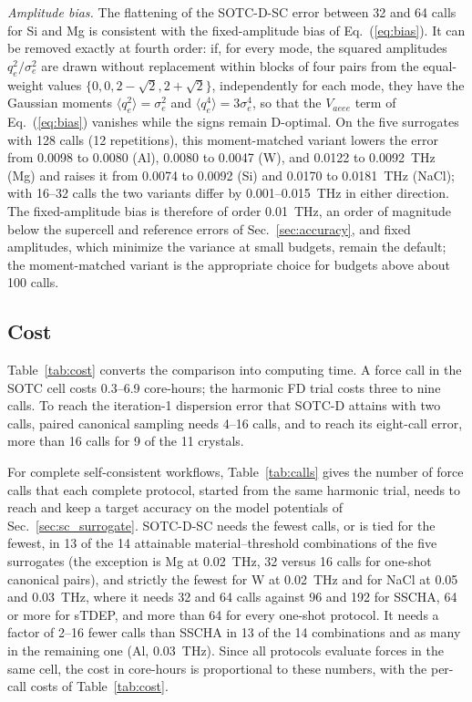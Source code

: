 \documentclass[aip,jap,reprint,amsmath,amssymb,floatfix]{revtex4-2}
\begin{document}
\textit{Amplitude bias.} The flattening of the SOTC-D-SC error between 32
and 64 calls for Si and Mg is consistent with the fixed-amplitude bias of
Eq.~(\ref{eq:bias}). It can be removed exactly at fourth order: if, for
every mode, the squared amplitudes $q_e^2/\sigma_e^2$ are drawn without
replacement within blocks of four pairs from the equal-weight values
$\{0,0,2-\sqrt2,2+\sqrt2\}$, independently for each mode, they have the
Gaussian moments $\langle q_e^2\rangle=\sigma_e^2$ and $\langle
q_e^4\rangle=3\sigma_e^4$, so that the $V_{aeee}$ term of Eq.~(\ref{eq:bias})
vanishes while the signs remain D-optimal. On the five surrogates with 128
calls (12 repetitions), this moment-matched variant lowers the error from
0.0098 to 0.0080 (Al), 0.0080 to 0.0047 (W), and 0.0122 to 0.0092~THz
(Mg) and raises it from 0.0074 to 0.0092 (Si) and 0.0170 to 0.0181~THz
(NaCl); with 16--32 calls the two variants differ by 0.001--0.015~THz in
either direction. The fixed-amplitude bias is therefore of order
0.01~THz, an order of magnitude below the supercell and reference errors of
Sec.~\ref{sec:accuracy}, and fixed amplitudes, which minimize the variance
at small budgets, remain the default; the moment-matched variant is the
appropriate choice for budgets above about 100 calls.



\subsection{Cost}

Table~\ref{tab:cost} converts the comparison into computing time. A force
call in the SOTC cell costs 0.3--6.9 core-hours; the harmonic FD trial costs
three to nine calls. To reach the iteration-1 dispersion error that SOTC-D
attains with two calls, paired canonical sampling needs 4--16 calls, and to
reach its eight-call error, more than 16 calls for 9 of the 11 crystals.

For complete self-consistent workflows, Table~\ref{tab:calls} gives the
number of force calls that each complete protocol, started from the same
harmonic trial, needs to reach and keep a target accuracy on the model
potentials of Sec.~\ref{sec:sc_surrogate}. SOTC-D-SC needs the fewest calls, or is tied
for the fewest, in 13 of the 14 attainable material--threshold combinations
of the five surrogates (the exception is Mg at 0.02~THz, 32 versus 16 calls
for one-shot canonical pairs), and strictly the fewest for W at 0.02~THz and
for NaCl at 0.05 and 0.03~THz, where it needs 32 and 64 calls against 96 and
192 for SSCHA, 64 or more for sTDEP, and more than 64 for every one-shot protocol. It
needs a factor of 2--16 fewer calls than SSCHA in 13 of the 14 combinations and as
many in the remaining one (Al, 0.03~THz). Since all protocols evaluate forces
in the same cell, the cost in core-hours is proportional to these numbers,
with the per-call costs of Table~\ref{tab:cost}.
\end{document}
